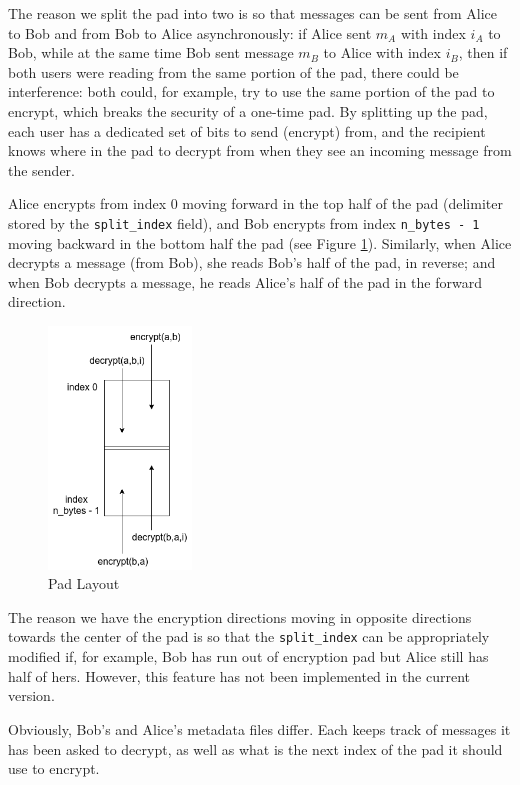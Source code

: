 \documentclass[twocolumn]{article}
\begin{document}
The reason we split the pad into two is so that messages can be sent from Alice to Bob and from Bob to Alice asynchronously: if Alice sent $m_A$ with index $i_A$ to Bob, while at the same time Bob sent message $m_B$ to Alice with index $i_B$, then if both users were reading from the same portion of the pad, there could be interference: both could, for example, try to use the same portion of the pad to encrypt, which breaks the security of a one-time pad. By splitting up the pad, each user has a dedicated set of bits to send (encrypt) from, and the recipient knows where in the pad to decrypt from when they see an incoming message from the sender.

Alice encrypts from index 0 moving forward in the top half of the pad (delimiter stored by the \texttt{split\_index} field), and Bob encrypts from index \texttt{n\_bytes - 1} moving backward in the bottom half the pad (see Figure \ref{fig:padsplit}). Similarly, when Alice decrypts a message (from Bob), she reads Bob's half of the pad, in reverse; and when Bob decrypts a message, he reads Alice's half of the pad in the forward direction.

\begin{figure}[htp]
\centering
\includegraphics[width=1.5in]{padsplit}
\caption{Pad Layout}
\label{fig:padsplit}
\end{figure}

The reason we have the encryption directions moving in opposite directions towards the center of the pad is so that the \texttt{split\_index} can be appropriately modified if, for example, Bob has run out of encryption pad but Alice still has half of hers. However, this feature has not been implemented in the current version.

Obviously, Bob's and Alice's metadata files differ. Each keeps track of messages it has been asked to decrypt, as well as what is the next index of the pad it should use to encrypt.
\end{document}
